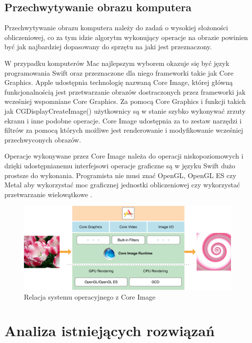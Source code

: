 \documentclass[12pt]{report}
\begin{document}
\newpage

\section{Przechwytywanie obrazu komputera}

Przechwytywanie obrazu komputera należy do zadań o wysokiej słożoności obliczeniowej, co za tym idzie algorytm wykonujący operacje na obrazie powinien być jak najbardziej dopasowany do sprzętu na jaki jest przeznaczony. 

W przypadku komputerów Mac najlepszym wyborem okazuje się być język programowania Swift oraz przeznaczone dla niego frameworki takie jak Core Graphics. Apple udostępnia technologię nazwaną Core Image, której główną funkcjonalnością jest przetwarzanie obrazów dostraczonych przez frameworki jak wcześniej wspomniane Core Graphics. Za pomocą Core Graphics i funkcji takich jak CGDisplayCreateImage() użytkownicy są w stanie szybko wykonywać zrzuty ekranu i inne podobne operacje. Core Image udostępnia za to zestaw narzędzi i filtrów za pomocą których możliwe jest renderowanie i modyfikowanie wcześniej przechwyconych obrazów.

Operacje wykonywane przez Core Image należa do operacji niskopoziomowych i dzięki udostępnianemu interfejsowi operacje graficzne są w języku Swift dużo prostsze do wykonania. Programista nie musi znać OpenGL, OpenGL ES czy Metal aby wykorzystać moc graficznej jednostki obliczeniowej czy wykorzystać przetwarzanie wielowątkowe \cite{swiftapple}.

\begin{figure}[h]
\centering
\includegraphics[width=\textwidth]{../resources/cg.png}
\caption{Relacja systemu operacyjnego z Core Image \cite{swiftapple}}
\end{figure}

\chapter[Analiza istniejących rozwiązań]{Analiza istniejących rozwiązań}
\end{document}
